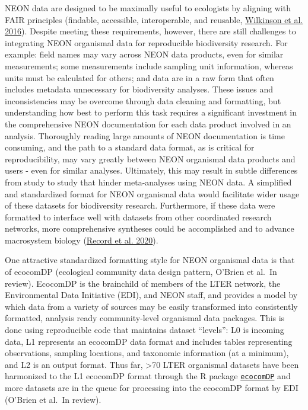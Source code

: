 \documentclass[
  12pt,
]{article}
\begin{document}
NEON data are designed to be maximally useful to ecologists by aligning with FAIR principles (findable, accessible, interoperable, and reusable, \protect\hyperlink{ref-wilkinson2016fair}{Wilkinson et al. 2016}). Despite meeting these requirements, however, there are still challenges to integrating NEON organismal data for reproducible biodiversity research. For example: field names may vary across NEON data products, even for similar measurements; some measurements include sampling unit information, whereas units must be calculated for others; and data are in a raw form that often includes metadata unnecessary for biodiversity analyses. These issues and inconsistencies may be overcome through data cleaning and formatting, but understanding how best to perform this task requires a significant investment in the comprehensive NEON documentation for each data product involved in an analysis. Thoroughly reading large amounts of NEON documentation is time consuming, and the path to a standard data format, as is critical for reproducibility, may vary greatly between NEON organismal data products and users - even for similar analyses. Ultimately, this may result in subtle differences from study to study that hinder meta-analyses using NEON data. A simplified and standardized format for NEON organismal data would facilitate wider usage of these datasets for biodiversity research. Furthermore, if these data were formatted to interface well with datasets from other coordinated research networks, more comprehensive syntheses could be accomplished and to advance macrosystem biology (\protect\hyperlink{ref-record2020novel}{Record et al. 2020}).

One attractive standardized formatting style for NEON organismal data is that of ecocomDP (ecological community data design pattern, O'Brien et al.~In review). EcocomDP is the brainchild of members of the LTER network, the Environmental Data Initiative (EDI), and NEON staff, and provides a model by which data from a variety of sources may be easily transformed into consistently formatted, analysis ready community-level organismal data packages. This is done using reproducible code that maintains dataset ``levels'': L0 is incoming data, L1 represents an ecocomDP data format and includes tables representing observations, sampling locations, and taxonomic information (at a minimum), and L2 is an output format. Thus far, \textgreater70 LTER organismal datasets have been harmonized to the L1 ecocomDP format through the R package \href{https://github.com/EDIorg/ecocomDP}{\texttt{ecocomDP}} and more datasets are in the queue for processing into the ecocomDP format by EDI (O'Brien et al.~In review).
\end{document}
